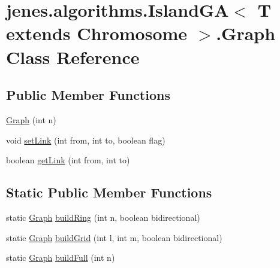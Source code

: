 \hypertarget{classjenes_1_1algorithms_1_1_island_g_a_3_01_t_01extends_01_chromosome_01_4_1_1_graph}{\section{jenes.\-algorithms.\-Island\-G\-A$<$ T extends Chromosome $>$.Graph Class Reference}
\label{classjenes_1_1algorithms_1_1_island_g_a_3_01_t_01extends_01_chromosome_01_4_1_1_graph}
}
\subsection*{Public Member Functions}
\begin{DoxyCompactItemize}
\item 
\hyperlink{classjenes_1_1algorithms_1_1_island_g_a_3_01_t_01extends_01_chromosome_01_4_1_1_graph_a531b51e8267b7ce8931ebef917040285}{Graph} (int n)
\item 
void \hyperlink{classjenes_1_1algorithms_1_1_island_g_a_3_01_t_01extends_01_chromosome_01_4_1_1_graph_a74c26804c4ac66dbb3b74b3fad2e808f}{set\-Link} (int from, int to, boolean flag)
\item 
boolean \hyperlink{classjenes_1_1algorithms_1_1_island_g_a_3_01_t_01extends_01_chromosome_01_4_1_1_graph_aa40de99735aa388e87c10f07ebe3be72}{get\-Link} (int from, int to)
\end{DoxyCompactItemize}
\subsection*{Static Public Member Functions}
\begin{DoxyCompactItemize}
\item 
static \hyperlink{classjenes_1_1algorithms_1_1_island_g_a_3_01_t_01extends_01_chromosome_01_4_1_1_graph_a531b51e8267b7ce8931ebef917040285}{Graph} \hyperlink{classjenes_1_1algorithms_1_1_island_g_a_3_01_t_01extends_01_chromosome_01_4_1_1_graph_afbb83bf011aa8a8c36be798322c92b8a}{build\-Ring} (int n, boolean bidirectional)
\item 
static \hyperlink{classjenes_1_1algorithms_1_1_island_g_a_3_01_t_01extends_01_chromosome_01_4_1_1_graph_a531b51e8267b7ce8931ebef917040285}{Graph} \hyperlink{classjenes_1_1algorithms_1_1_island_g_a_3_01_t_01extends_01_chromosome_01_4_1_1_graph_a2ca9b63bd17a6c3ffd60916d86761a2e}{build\-Grid} (int l, int m, boolean bidirectional)
\item 
static \hyperlink{classjenes_1_1algorithms_1_1_island_g_a_3_01_t_01extends_01_chromosome_01_4_1_1_graph_a531b51e8267b7ce8931ebef917040285}{Graph} \hyperlink{classjenes_1_1algorithms_1_1_island_g_a_3_01_t_01extends_01_chromosome_01_4_1_1_graph_a1cd6f1174e30a20a506e7cc4e4293af0}{build\-Full} (int n)
\end{DoxyCompactItemize}
